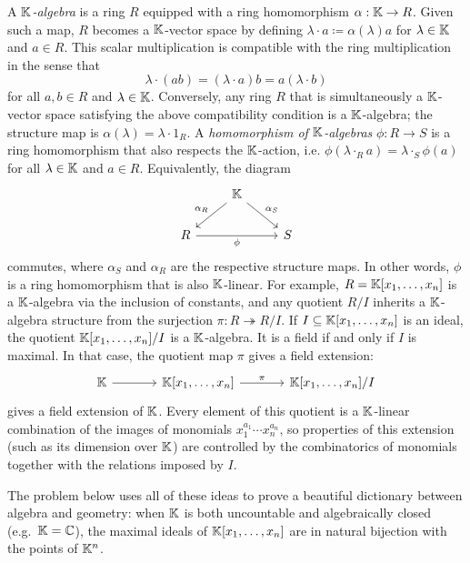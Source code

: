 \documentclass[Notebook.tex]{subfiles}
\begin{document}
A \emph{$\mathbb K$-algebra} is a ring $R$ equipped with a ring homomorphism $\alpha: \mathbb K \to R$. Given such a map, $R$ becomes a
$\mathbb K$-vector space by defining $\lambda\cdot a \coloneqq \alpha(\lambda)a$ for $\lambda\in\mathbb K$ and $a\in R$. This scalar multiplication is compatible with the ring multiplication in the sense that
\[
\lambda\cdot(ab) = (\lambda\cdot a)b = a(\lambda\cdot b)
\]
for all $a,b\in R$ and $\lambda \in \mathbb K$. Conversely, any ring $R$ that is simultaneously a $\mathbb K$-vector space satisfying the above compatibility condition is a $\mathbb K$-algebra; the structure map is $\alpha(\lambda)=\lambda\cdot 1_R$. A \emph{homomorphism of $\mathbb K$-algebras} $\phi: R\to S$ is a
ring homomorphism that also respects the $\mathbb K$-action, i.e. $\phi(\lambda \cdot_{R} a) = \lambda \cdot_{S} \phi(a)$ for all $\lambda \in \mathbb K$ and $a\in R$. Equivalently, the diagram
\[
\begin{tikzcd}
& \K \arrow[dl,"\alpha_R"'] \arrow[dr,"\alpha_S"] & \\
R \arrow[rr,"\phi"'] & & S
\end{tikzcd}
\]
commutes, where $\alpha_S$ and $\alpha_R$ are the respective structure maps. In other words, $\phi$ is a ring homomorphism that is also $\mathbb K$-linear.  For example, $R=\mathbb K[x_1,\ldots,x_n]$ is a $\mathbb K$-algebra via the inclusion of constants, and any quotient $R/I$ inherits a $\mathbb K$-algebra structure from the surjection $\pi:R\twoheadrightarrow R/I$. If $I\subseteq \mathbb K[x_1,\ldots,x_n]$ is an ideal, the quotient $\mathbb K[x_1,\ldots,x_n]/I$ is a $\mathbb K$-algebra. It is a field if and only if $I$ is maximal. In that case, the quotient map $\pi$ gives a field extension:
\[
\begin{tikzcd}[row sep = .5em, column sep = 3.5em]
\K \arrow[r] & \K[x_1,\ldots,x_n] \arrow[r,"\pi"]  & \K[x_1,\ldots,x_n]/I
\end{tikzcd}
\]
 gives a field extension of $\mathbb K$. Every element of this quotient is a $\mathbb K$-linear combination of the images of monomials $x_1^{a_1}\cdots x_n^{a_n}$, so properties of this extension (such as its dimension over $\mathbb K$) are controlled by the combinatorics of monomials together with the relations imposed by $I$.

The problem below uses all of these ideas to prove a beautiful dictionary between algebra and geometry: when $\mathbb K$ is both uncountable and algebraically closed (e.g.\ $\mathbb K=\mathbb C$), the maximal ideals of $\mathbb K[x_1,\ldots,x_n]$ are in natural bijection with the points of $\mathbb K^n$.

\hrulefill

\newpage
\end{document}
